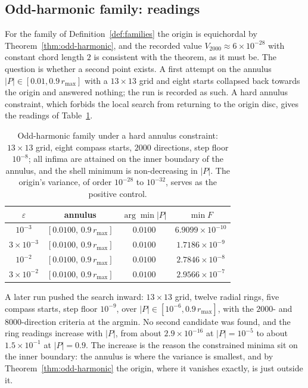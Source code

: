 \documentclass[11pt]{article}
\theoremstyle{definition}
\theoremstyle{remark}
\begin{document}
{\subsection{Odd-harmonic family: readings}

For the family of Definition~\ref{def:families} the origin is equichordal by Theorem~\ref{thm:odd-harmonic}, and
the recorded value $V_{2000}\approx6\times10^{-28}$ with constant chord length $2$ is consistent with the theorem,
as it must be. The question is whether a second point exists. A first attempt on the annulus
$|P|\in[0.01,0.9\,r_{\max}]$ with a $13\times13$ grid and eight starts collapsed back towards the origin and
answered nothing; the run is recorded as such. A hard annulus constraint, which forbids the local search from
returning to the origin disc, gives the readings of Table~\ref{tab:fourier}.

\begin{table}[htbp]
\centering
\small
\caption{Odd-harmonic family under a hard annulus constraint: $13\times13$ grid, eight compass starts, $2000$
directions, step floor $10^{-8}$; all infima are attained on the inner boundary of the annulus, and the shell
minimum is non-decreasing in $|P|$. The origin's variance, of order $10^{-28}$ to $10^{-32}$, serves as the
positive control.}
\label{tab:fourier}
\begin{tabular}{@{}cccc@{}}
\toprule
$\varepsilon$ & annulus & $\arg\min |P|$ & $\min F$ \\
\midrule
$10^{-3}$ & $[0.0100,\,0.9\,r_{\max}]$ & $0.0100$ & $6.9099\times10^{-10}$ \\
$3\times10^{-3}$ & $[0.0100,\,0.9\,r_{\max}]$ & $0.0100$ & $1.7186\times10^{-9}$ \\
$10^{-2}$ & $[0.0100,\,0.9\,r_{\max}]$ & $0.0100$ & $2.7846\times10^{-8}$ \\
$3\times10^{-2}$ & $[0.0100,\,0.9\,r_{\max}]$ & $0.0100$ & $2.9566\times10^{-7}$ \\
\bottomrule
\end{tabular}
\end{table}

A later run pushed the search inward: $13\times13$ grid, twelve radial rings, five compass starts, step floor
$10^{-9}$, over $|P|\in[10^{-6},0.9\,r_{\max}]$, with the $2000$- and $8000$-direction criteria at the argmin. No
second candidate was found, and the ring readings increase with $|P|$, from about $2.9\times10^{-16}$ at
$|P|=10^{-5}$ to about $1.5\times10^{-1}$ at $|P|=0.9$. The increase is the reason the constrained minima sit on the
inner boundary: the annulus is where the variance is smallest, and by Theorem~\ref{thm:odd-harmonic} the origin,
where it vanishes exactly, is just outside it.

}
\end{document}
